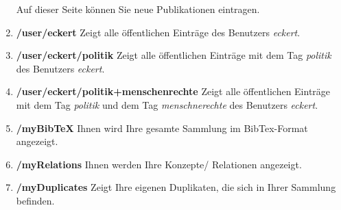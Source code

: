 \begin{enumerate}
    Auf dieser Seite können Sie neue Publikationen eintragen. 
    \item \textbf{/user/eckert} \newline
    Zeigt alle öffentlichen Einträge des Benutzers \textit{eckert}.
    \item \textbf{/user/eckert/politik} \newline
    Zeigt alle öffentlichen Einträge mit dem Tag \textit{politik} des Benutzers \textit{eckert}.
    \item \textbf{/user/eckert/politik+menschenrechte} \newline
    Zeigt alle öffentlichen Einträge mit dem Tag \textit{politik} und dem Tag \textit{menschnerechte} des Benutzers \textit{eckert}.
     \item \textbf{/myBibTeX} \newline
    Ihnen wird Ihre gesamte Sammlung im BibTex-Format angezeigt.
    \item \textbf{/myRelations} \newline
    Ihnen werden Ihre Konzepte/ Relationen angezeigt.
    \item \textbf{/myDuplicates} \newline
    Zeigt Ihre eigenen Duplikaten, die sich in Ihrer Sammlung befinden.
\end{enumerate}
    
